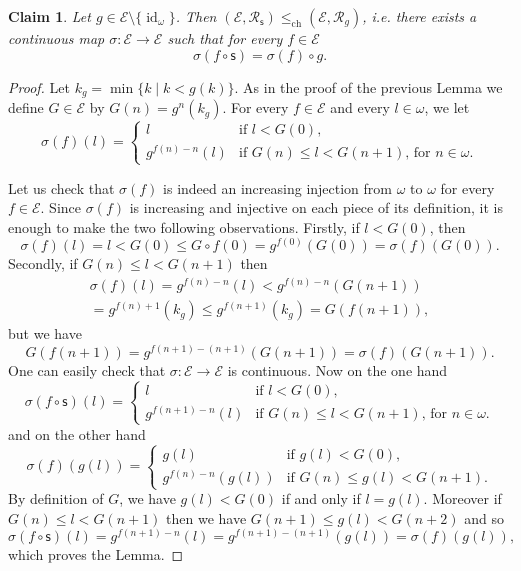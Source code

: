 \documentclass{article}%
\newcommand\printbibliography{}
\theoremstyle{plain}
\newtheorem{lemma}[theorem]{Properties}
\newtheorem{lemma}[theorem]{Lemma}
\newtheorem{lemma}[theorem]{Fact}
\newtheorem{lemma}[theorem]{Facts}
\newtheorem{lemma}{Claim}
\theoremstyle{definition}
\theoremstyle{remark}
\newcommand{\contMor}{\leq_{\text{ch}}}
\DeclareMathOperator{\id}{\mathrm{id}} %
\newcommand{\Su}{\mathsf{s}}
\newcommand{\IIf}{\mathcal{E}}
\newcommand{\rtrans}[1]{\mathcal{R}_{#1}}
\begin{document}
\begin{lemma}\label{EmapLemma}
Let $g\in\IIf\setminus\{\id_{\omega}\}$. Then $(\IIf,\rtrans{\Su})\contMor(\IIf,\rtrans{g})$, i.e. there exists a continuous map $\sigma : \IIf \to \IIf$ such that for every $f\in \IIf$
\[
\sigma (f\circ \Su)=\sigma (f)\circ g.
\]
\end{lemma}
\begin{proof}
Let $k_{g}=\min\{k\mid k<g(k)\}$. As in the proof of the previous Lemma we define $G\in \IIf$ by $G(n)=g^{n}(k_{g})$. For every $f\in\IIf$ and every $l\in\omega$, we let
\[
\sigma (f)(l)=\begin{cases}
l &\text{if $l<G(0)$,}\\
g^{f(n)-n}(l) &\text{if $G(n)\leq l<G(n+1)$, for $n\in\omega$.}
\end{cases}
\]

Let us check that $\sigma (f)$ is indeed an increasing injection from $\omega$ to $\omega$ for every $f\in \IIf$. Since $\sigma (f)$ is increasing and injective on each piece of its definition, it is enough to make the two following observations. Firstly, if $l<G(0)$, then
\[
\sigma (f)(l)=l<G(0)\leq G\circ f(0)=g^{f(0)}(G(0))=\sigma (f)(G(0)).
\]
Secondly, if $G(n)\leq l<G(n+1)$ then 
\begin{multline*}
\sigma (f)(l)=g^{f(n)-n}(l)<g^{f(n)-n}(G(n+1))\\=g^{f(n)+1}(k_{g})\leq g^{f(n+1)}(k_{g})=G ( f(n+1)),
\end{multline*}
but we have
\[
G(f(n+1))=g^{f(n+1)-(n+1)}(G(n+1))=\sigma (f)(G(n+1)).
\]
One can easily check that $\sigma : \IIf \to \IIf$ is continuous.
Now on the one hand
\[
\sigma (f\circ \Su)(l)=\begin{cases}
l &\text{if $l<G(0)$,}\\
g^{f(n+1)-n}(l) &\text{if $G(n)\leq l<G(n+1)$, for $n\in\omega$.}
\end{cases}
\]
and on the other hand
\[
\sigma (f)(g(l))=\begin{cases}
g(l) &\text{if $g(l)<G(0)$,}\\
g^{f(n)-n}(g(l)) &\text{if $G(n)\leq g(l)<G(n+1)$.}
\end{cases}
\]
By definition of $G$, we have $g(l)<G(0)$ if and only if $l=g(l)$. 
Moreover if $G(n)\leq l<G(n+1)$ then we have $G(n+1)\leq g(l)<G(n+2)$ and so
\[
\sigma ( f\circ \Su)(l)=g^{f(n+1)-n}(l)=g^{f(n+1)-(n+1)}(g(l))=\sigma (f)(g(l)),
\]
which proves the Lemma. 
\end{proof}










\printbibliography
\end{document}
